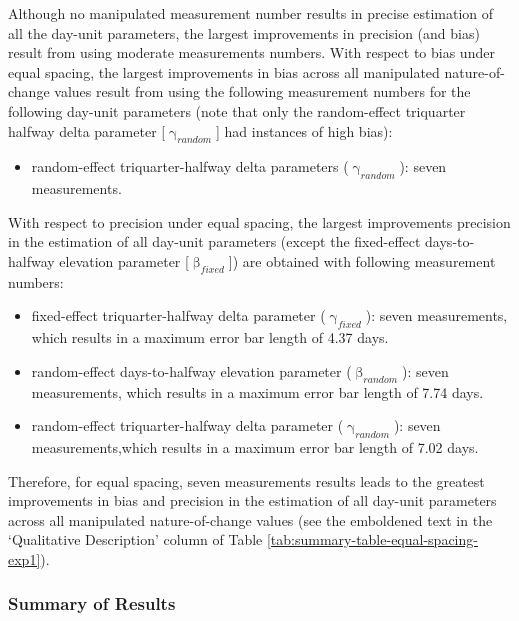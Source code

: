 \documentclass[
12pt, %
twoside,
english]{guelphthesis}
\theoremstyle{definition}
\theoremstyle{definition}
\theoremstyle{definition}
\theoremstyle{definition}
\theoremstyle{remark}
\begin{document}
Although no manipulated measurement number results in precise estimation of all the day-unit parameters, the largest improvements in precision (and bias) result from using moderate measurements numbers. With respect to bias under equal spacing, the largest improvements in bias across all manipulated nature-of-change values result from using the following measurement numbers for the following day-unit parameters (note that only the random-effect triquarter halfway delta parameter {[}\(\upgamma_{random}\){]} had instances of high bias):
\begin{itemize}
\tightlist
\item
  random-effect triquarter-halfway delta parameters (\(\upgamma_{random}\)): seven measurements.
\end{itemize}
\noindent With respect to precision under equal spacing, the largest improvements precision in the estimation of all day-unit parameters (except the fixed-effect days-to-halfway elevation parameter {[}\(\upbeta_{fixed}\){]}) are obtained with following measurement numbers:
\begin{itemize}
\tightlist
\item
  fixed-effect triquarter-halfway delta parameter (\(\upgamma_{fixed}\)): seven measurements, which results in a maximum error bar length of 4.37 days.
\item
  random-effect days-to-halfway elevation parameter (\(\upbeta_{random}\)): seven measurements, which results in a maximum error bar length of 7.74 days.
\item
  random-effect triquarter-halfway delta parameter (\(\upgamma_{random}\)): seven measurements,which results in a maximum error bar length of 7.02 days.
\end{itemize}
\noindent Therefore, for equal spacing, seven measurements results leads to the greatest improvements in bias and precision in the estimation of all day-unit parameters across all manipulated nature-of-change values (see the emboldened text in the `Qualitative Description' column of Table \ref{tab:summary-table-equal-spacing-exp1}).

\hypertarget{summary-of-results}{%
\subsubsection{Summary of Results}\label{summary-of-results}}
\end{document}
